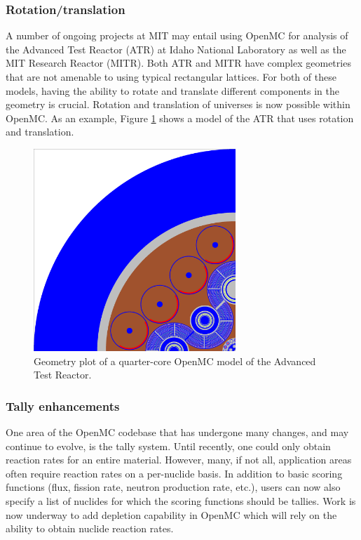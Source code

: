 \documentclass{ansconf}
\begin{document}
\subsubsection{Rotation/translation}

A number of ongoing projects at MIT may entail using OpenMC for analysis of the
Advanced Test Reactor (ATR) at Idaho National Laboratory as well as the MIT
Research Reactor (MITR). Both ATR and MITR have complex geometries that are not
amenable to using typical rectangular lattices. For both of these models, having
the ability to rotate and translate different components in the geometry is
crucial. Rotation and translation of universes is now possible within OpenMC. As
an example, Figure \ref{fig:atr} shows a model of the ATR that uses rotation and
translation.

\begin{figure}[!htb]
  \centering
  \includegraphics[width=3.0in]{atr.png}
  \caption{Geometry plot of a quarter-core OpenMC model of the Advanced Test
    Reactor.}
  \label{fig:atr}
\end{figure}  

\subsubsection{Tally enhancements} 

One area of the OpenMC codebase that has undergone many changes, and may
continue to evolve, is the tally system. Until recently, one could only obtain
reaction rates for an entire material. However, many, if not all, application
areas often require reaction rates on a per-nuclide basis. In addition to basic
scoring functions (flux, fission rate, neutron production rate, etc.), users can
now also specify a list of nuclides for which the scoring functions should be
tallies. Work is now underway to add depletion capability in OpenMC which will
rely on the ability to obtain nuclide reaction rates.
\end{document}
